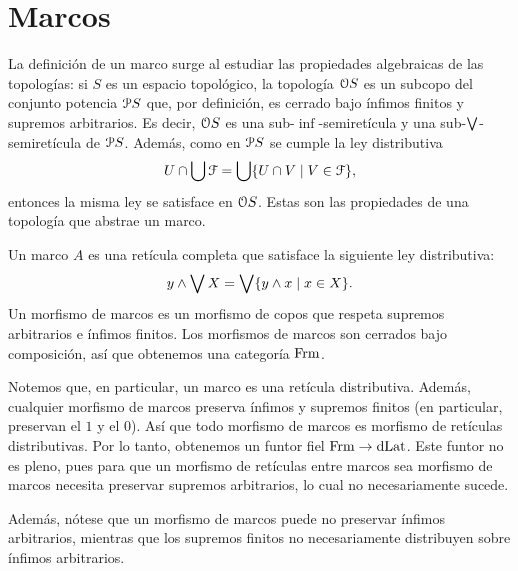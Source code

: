 \section{Marcos}
La definición de un marco surge al estudiar las propiedades
algebraicas de las topologías:
si $S$ es un espacio topológico, la topología $\cal OS$ es
un subcopo del conjunto potencia $\cal PS$ que,
por definición, es cerrado bajo ínfimos finitos y
supremos arbitrarios. Es decir, $\cal OS$ es una
sub-$\inf$-semiretícula y una sub-$\Sup$-semiretícula de $\cal
PS$.
Además, como en $\cal PS$ se cumple la ley distributiva
\begin{equation}
  U\cap\bigcup \cal F=\bigcup\{U\cap V\mid V\in\cal F\},
\end{equation}
entonces la misma ley se satisface en $\cal OS$.
Estas son las propiedades de una topología que abstrae un marco.

\begin{defn}
  Un marco $A$ es una retícula completa que satisface la siguiente
  ley distributiva:
  \[
      y\inf\Sup X = \Sup\{y\inf x\mid x\in X\}
  .\]
  Un morfismo de marcos es un morfismo de copos que respeta
  supremos arbitrarios e ínfimos finitos.
  Los morfismos de marcos son cerrados
  bajo composición, así que obtenemos una categoría $\Frm$.
\end{defn}

Notemos que, en particular, un marco es una retícula distributiva.
Además, cualquier morfismo de marcos preserva ínfimos y supremos
finitos (en particular, preservan el $1$ y el $0$). Así que todo
morfismo de marcos es morfismo de retículas distributivas. Por lo
tanto, obtenemos un funtor fiel $\Frm\to\DLat$. Este funtor no es
pleno, pues para que un morfismo de retículas entre marcos sea
morfismo de marcos necesita preservar supremos arbitrarios, lo cual no
necesariamente sucede.

Además, nótese que un morfismo de marcos puede no preservar ínfimos
arbitrarios, mientras que los supremos finitos no necesariamente
distribuyen sobre ínfimos arbitrarios.

